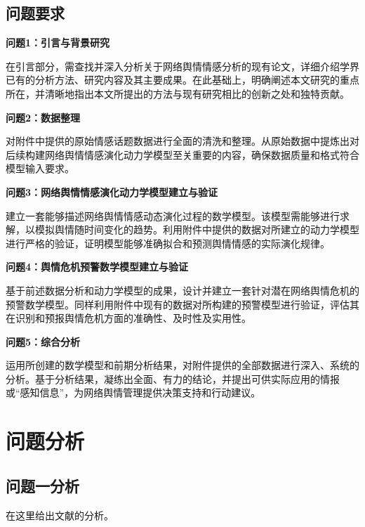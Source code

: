 \documentclass[withoutpreface,bwprint]{cumcmthesis}
\begin{document}
\subsection{问题要求}

\textbf{问题1：引言与背景研究}

在引言部分，需查找并深入分析关于网络舆情情感分析的现有论文，详细介绍学界已有的分析方法、研究内容及其主要成果。在此基础上，明确阐述本文研究的重点所在，并清晰地指出本文所提出的方法与现有研究相比的创新之处和独特贡献。

\textbf{问题2：数据整理}

 对附件中提供的原始情感话题数据进行全面的清洗和整理。从原始数据中提炼出对后续构建网络舆情情感演化动力学模型至关重要的内容，确保数据质量和格式符合模型输入要求。


\textbf{问题3：网络舆情情感演化动力学模型建立与验证}

建立一套能够描述网络舆情情感动态演化过程的数学模型。该模型需能够进行求解，以模拟舆情随时间变化的趋势。利用附件中提供的数据对所建立的动力学模型进行严格的验证，证明模型能够准确拟合和预测舆情情感的实际演化规律。


\textbf{问题4：舆情危机预警数学模型建立与验证}

基于前述数据分析和动力学模型的成果，设计并建立一套针对潜在网络舆情危机的预警数学模型。同样利用附件中现有的数据对所构建的预警模型进行验证，评估其在识别和预报舆情危机方面的准确性、及时性及实用性。


\textbf{问题5：综合分析}

运用所创建的数学模型和前期分析结果，对附件提供的全部数据进行深入、系统的分析。基于分析结果，凝练出全面、有力的结论，并提出可供实际应用的情报或“感知信息”，为网络舆情管理提供决策支持和行动建议。





\section{问题分析}
\subsection{问题一分析}
在这里给出文献的分析。
\end{document}
